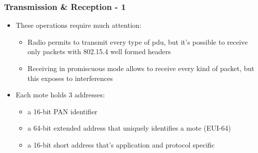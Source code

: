 \begin{frame}[fragile]
  \frametitle{Transmission \& Reception - 1}
  \begin{itemize}
    \item These operations require much attention:
    \begin{itemize}
    	\item Radio permits to transmit every type of pdu, but it's possible to receive only packets with 802.15.4 well formed headers
    	\item Receiving in promiscuous mode allows to receive every kind of packet, but this exposes to interferences
    \end{itemize}
    \item Each mote holds 3 addresses:
    \begin{itemize}
    	\item a 16-bit PAN identifier
    	\item a 64-bit extended address that uniquely identifies a mote (EUI-64)
    	\item a 16-bit short address that's application and protocol specific
    \end{itemize}
  \end{itemize}
\end{frame}

